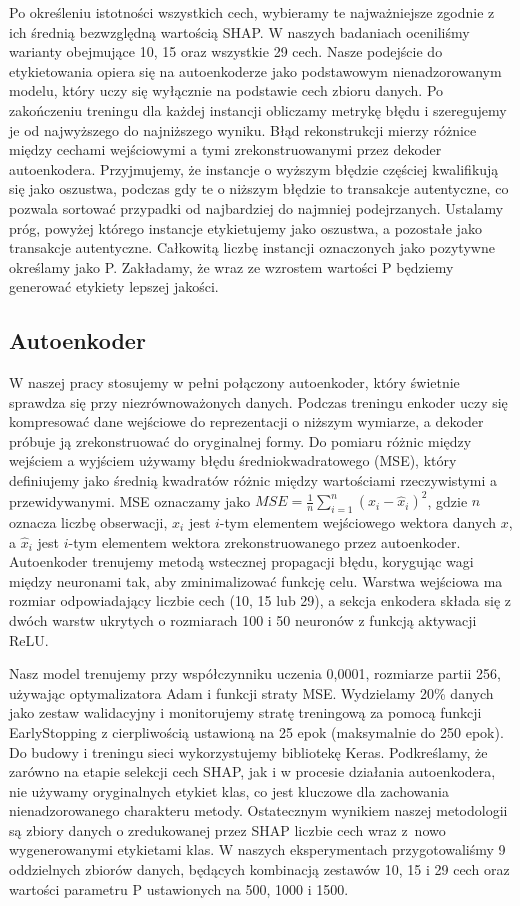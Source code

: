 \documentclass [runningheads]{llncs}
\begin{document}
Po określeniu istotności wszystkich cech, wybieramy te najważniejsze zgodnie z ich średnią bezwzględną wartością SHAP.
W naszych badaniach oceniliśmy warianty obejmujące 10, 15 oraz wszystkie 29 cech.
Nasze podejście do etykietowania opiera się na autoenkoderze jako podstawowym nienadzorowanym modelu, 
który uczy się wyłącznie na podstawie cech zbioru danych. Po zakończeniu treningu dla każdej instancji obliczamy metrykę błędu i szeregujemy je od najwyższego do najniższego wyniku.
Błąd rekonstrukcji mierzy różnice między cechami wejściowymi a tymi zrekonstruowanymi przez dekoder autoenkodera\cite{article-autoencoder}.
Przyjmujemy, że instancje o wyższym błędzie częściej kwalifikują się jako oszustwa, podczas gdy te o niższym błędzie to transakcje autentyczne, co pozwala sortować przypadki od najbardziej do najmniej podejrzanych.
Ustalamy próg, powyżej którego instancje etykietujemy jako oszustwa, a pozostałe jako transakcje autentyczne. Całkowitą liczbę instancji oznaczonych jako pozytywne określamy jako P.
Zakładamy, że wraz ze wzrostem wartości P będziemy generować etykiety lepszej jakości.

\subsection*{Autoenkoder}
W naszej pracy stosujemy w pełni połączony autoenkoder\cite{article-autoencoder-imbalanced}, który świetnie sprawdza się przy niezrównoważonych danych. 
Podczas treningu enkoder uczy się kompresować dane wejściowe do reprezentacji o niższym wymiarze, a dekoder próbuje ją zrekonstruować do oryginalnej formy.
Do pomiaru różnic między wejściem a wyjściem używamy błędu średniokwadratowego (MSE), który definiujemy jako średnią kwadratów różnic między wartościami rzeczywistymi a przewidywanymi.
MSE oznaczamy jako \(MSE = \frac{1}{n}\sum_{i=1}^{n}(x_i - \hat{x}_i)^2\), gdzie \(n\) oznacza liczbę obserwacji, 
\(x_i\) jest \(i\)-tym elementem wejściowego wektora danych \(x\), a \(\hat{x}_i\) jest \(i\)-tym elementem wektora zrekonstruowanego przez autoenkoder.
Autoenkoder trenujemy metodą wstecznej propagacji błędu, korygując wagi między neuronami tak, aby zminimalizować funkcję celu. Warstwa wejściowa ma rozmiar odpowiadający liczbie cech (10, 15 lub 29), 
a sekcja enkodera składa się z dwóch warstw ukrytych o rozmiarach 100 i 50 neuronów z funkcją aktywacji ReLU.

Nasz model trenujemy przy współczynniku uczenia 0,0001, rozmiarze partii 256, używając optymalizatora Adam i funkcji straty MSE. 
Wydzielamy 20\% danych jako zestaw walidacyjny i monitorujemy stratę treningową za pomocą funkcji EarlyStopping z cierpliwością ustawioną na 25 epok (maksymalnie do 250 epok).
Do budowy i treningu sieci wykorzystujemy bibliotekę Keras\cite{url-keras}. Podkreślamy, że zarówno na etapie selekcji cech SHAP, jak i w procesie działania autoenkodera, 
nie używamy oryginalnych etykiet klas, co jest kluczowe dla zachowania nienadzorowanego charakteru metody.
Ostatecznym wynikiem naszej metodologii są zbiory danych o zredukowanej przez SHAP liczbie cech wraz z~nowo wygenerowanymi etykietami klas. 
W naszych eksperymentach przygotowaliśmy 9 oddzielnych zbiorów danych, będących kombinacją zestawów 10, 15 i 29 cech oraz wartości parametru P ustawionych na 500, 1000 i 1500.
\end{document}
